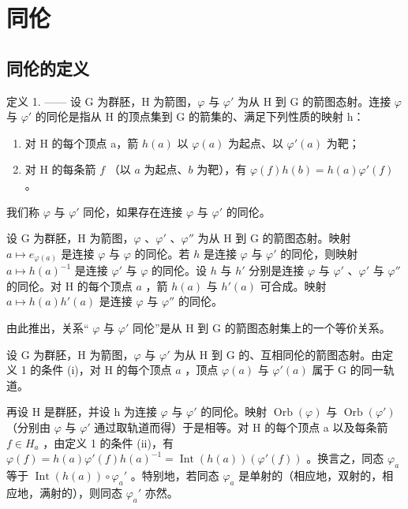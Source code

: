 \section{同伦}

\subsection{同伦的定义}

定义 1. —— 设 G 为群胚，H 为箭图，\(\varphi\) 与 \(\varphi'\) 为从 H 到 G 的箭图态射。连接 \(\varphi\) 与 \(\varphi'\) 的同伦是指从 H 的顶点集到 G 的箭集的、满足下列性质的映射 h：

\begin{enumerate}
\def\labelenumi{(\roman{enumi})}
\item
  对 H 的每个顶点 a，箭 \(h(a)\) 以 \(\varphi(a)\) 为起点、以 \(\varphi'(a)\) 为靶；
\item
  对 H 的每条箭 \(f\) （以 \(a\) 为起点、\(b\) 为靶），有 \(\varphi(f)h(b)=h(a)\varphi'(f)\) 。
\end{enumerate}

我们称 \(\varphi\) 与 \(\varphi'\) 同伦，如果存在连接 \(\varphi\) 与 \(\varphi'\) 的同伦。

设 G 为群胚，H 为箭图，\(\varphi\) 、\(\varphi'\) 、\(\varphi''\) 为从 H 到 G 的箭图态射。映射 \(a \mapsto e_{\varphi(a)}\) 是连接 \(\varphi\) 与 \(\varphi\) 的同伦。若 \(h\) 是连接 \(\varphi\) 与 \(\varphi'\) 的同伦，则映射 \(a \mapsto h(a)^{-1}\) 是连接 \(\varphi'\) 与 \(\varphi\) 的同伦。设 \(h\) 与 \(h'\) 分别是连接 \(\varphi\) 与 \(\varphi'\) 、\(\varphi'\) 与 \(\varphi''\) 的同伦。对 H 的每个顶点 \(a\) ，箭 \(h(a)\) 与 \(h'(a)\) 可合成。映射 \(a \mapsto h(a)h'(a)\) 是连接 \(\varphi\) 与 \(\varphi''\) 的同伦。

由此推出，关系“ \(\varphi\) 与 \(\varphi'\) 同伦”是从 H 到 G 的箭图态射集上的一个等价关系。

设 G 为群胚，H 为箭图，\(\varphi\) 与 \(\varphi'\) 为从 H 到 G 的、互相同伦的箭图态射。由定义 1 的条件 (i)，对 H 的每个顶点 \(a\) ，顶点 \(\varphi(a)\) 与 \(\varphi'(a)\) 属于 G 的同一轨道。

再设 H 是群胚，并设 h 为连接 \(\varphi\) 与 \(\varphi'\) 的同伦。映射 \(\operatorname{Orb}(\varphi)\) 与 \(\operatorname{Orb}(\varphi')\) （分别由 \(\varphi\) 与 \(\varphi'\) 通过取轨道而得）于是相等。对 H 的每个顶点 a 以及每条箭 \(f \in H_{a}\) ，由定义 1 的条件 (ii)，有 \(\varphi(f) = h(a)\varphi'(f)h(a)^{-1} = \operatorname{Int}(h(a))(\varphi'(f))\) 。换言之，同态 \(\varphi_{a}\) 等于 \(\operatorname{Int}(h(a)) \circ \varphi_{a}'\) 。特别地，若同态 \(\varphi_{a}\) 是单射的（相应地，双射的，相应地，满射的），则同态 \(\varphi_{a}'\) 亦然。

